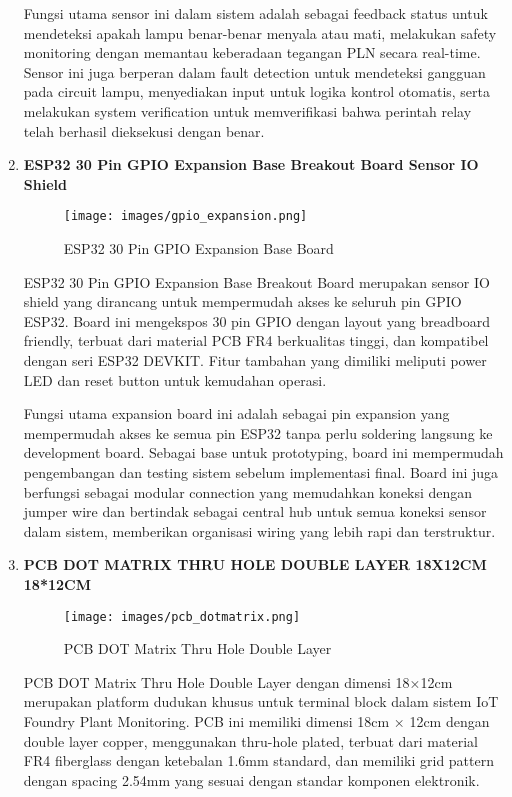 \documentclass[12pt,a4paper]{article}
\begin{document}
\begin{enumerate}[leftmargin=0pt,itemsep=1em]
Fungsi utama sensor ini dalam sistem adalah sebagai feedback status untuk mendeteksi apakah lampu benar-benar menyala atau mati, melakukan safety monitoring dengan memantau keberadaan tegangan PLN secara real-time. Sensor ini juga berperan dalam fault detection untuk mendeteksi gangguan pada circuit lampu, menyediakan input untuk logika kontrol otomatis, serta melakukan system verification untuk memverifikasi bahwa perintah relay telah berhasil dieksekusi dengan benar.

\item \textbf{ESP32 30 Pin GPIO Expansion Base Breakout Board Sensor IO Shield}

\begin{figure}[H]
\centering
\texttt{[image: images/gpio\_expansion.png]}
\caption{ESP32 30 Pin GPIO Expansion Base Board}
\label{fig:gpio_expansion}
\end{figure}

ESP32 30 Pin GPIO Expansion Base Breakout Board merupakan sensor IO shield yang dirancang untuk mempermudah akses ke seluruh pin GPIO ESP32. Board ini mengekspos 30 pin GPIO dengan layout yang breadboard friendly, terbuat dari material PCB FR4 berkualitas tinggi, dan kompatibel dengan seri ESP32 DEVKIT. Fitur tambahan yang dimiliki meliputi power LED dan reset button untuk kemudahan operasi.

Fungsi utama expansion board ini adalah sebagai pin expansion yang mempermudah akses ke semua pin ESP32 tanpa perlu soldering langsung ke development board. Sebagai base untuk prototyping, board ini mempermudah pengembangan dan testing sistem sebelum implementasi final. Board ini juga berfungsi sebagai modular connection yang memudahkan koneksi dengan jumper wire dan bertindak sebagai central hub untuk semua koneksi sensor dalam sistem, memberikan organisasi wiring yang lebih rapi dan terstruktur.

\item \textbf{PCB DOT MATRIX THRU HOLE DOUBLE LAYER 18X12CM 18*12CM}

\begin{figure}[H]
\centering
\texttt{[image: images/pcb\_dotmatrix.png]}
\caption{PCB DOT Matrix Thru Hole Double Layer}
\label{fig:pcb_dotmatrix}
\end{figure}

PCB DOT Matrix Thru Hole Double Layer dengan dimensi 18×12cm merupakan platform dudukan khusus untuk terminal block dalam sistem IoT Foundry Plant Monitoring. PCB ini memiliki dimensi 18cm × 12cm dengan double layer copper, menggunakan thru-hole plated, terbuat dari material FR4 fiberglass dengan ketebalan 1.6mm standard, dan memiliki grid pattern dengan spacing 2.54mm yang sesuai dengan standar komponen elektronik.


\end{enumerate}
\end{document}
